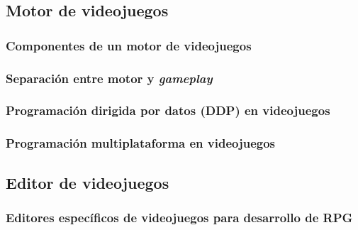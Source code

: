 \subsection{Motor de videojuegos}

\subsubsection{Componentes de un motor de videojuegos}

\subsubsection{Separación entre motor y \textit{gameplay}}

\subsubsection{Programación dirigida por datos (DDP) en videojuegos}

\subsubsection{Programación multiplataforma en videojuegos}

\subsection{Editor de videojuegos}

\subsubsection{Editores específicos de videojuegos para desarrollo de RPG}

